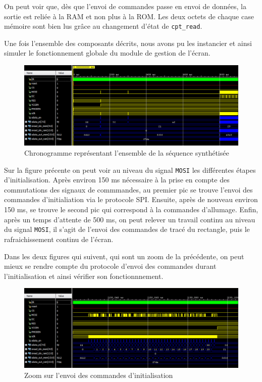 \documentclass[11pt]{article}
\begin{document}
\begin{itemize}
\begin{itemize}
On peut voir que, dès que l'envoi de commandes passe en envoi de données, la sortie est reliée à la RAM et non plus à la ROM. Les deux octets de chaque case mémoire sont bien lus grâce au changement d'état de \texttt{cpt\_read}.

\end{itemize}

\end{itemize}

Une fois l'ensemble des composants décrits, nous avons pu les instancier et ainsi simuler le fonctionnement globale du module de gestion de l'écran.

\begin{figure}[H]
\begin{center}
\includegraphics[scale = 0.3, keepaspectratio]{chrono_1}
\caption{Chronogramme représentant l'ensemble de la séquence synthétisée}
\end{center}
\end{figure}

Sur la figure précente on peut voir au niveau du signal \texttt{MOSI} les différentes étapes d'initialisation. Après environ 150 ms nécessaire à la prise en compte des commutations des signaux de commmandes, au premier pic se trouve l'envoi des commandes d'initialiation via le protocole SPI. Ensuite, après de nouveau environ 150 ms, se trouve le second pic qui correspond à la commandes d'allumage. Enfin, après un temps d'attente de 500 ms, on peut relever un travail continu au niveau du signal \texttt{MOSI}, il s'agit de l'envoi des commandes de tracé du rectangle, puis le rafraichissement continu de l'écran.

Dans les deux figures qui suivent, qui sont un zoom de la précédente, on peut mieux se rendre compte du protocole d'envoi des commandes durant l'initialisation et ainsi vérifier son fonctionnnement.

\begin{figure}[H]
\begin{center}
\includegraphics[scale = 0.3, keepaspectratio]{chrono_2}
\caption{Zoom sur l'envoi des commandes d'initialisation}
\end{center}
\end{figure}
\end{document}
